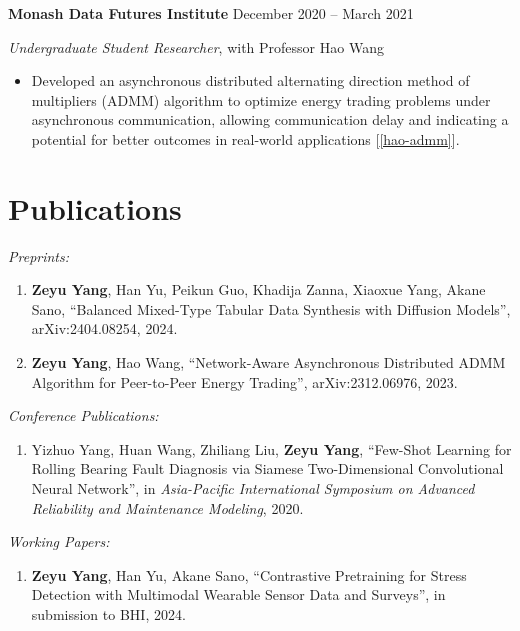 \documentclass[11pt]{article}
\begin{document}
\vspace{\lineskip}

\textbf{Monash Data Futures Institute} \hfill December 2020 -- March 2021

\textit{Undergraduate Student Researcher}, with Professor Hao Wang

\begin{itemize}
    \item Developed an asynchronous distributed alternating direction method of multipliers (ADMM) algorithm to optimize energy trading problems under asynchronous communication, allowing communication delay and indicating a potential for better outcomes in real-world applications [\ref{hao-admm}].
\end{itemize}

\section*{Publications}
    
\textit{Preprints:}

\begin{enumerate}	
    \item \label{akane-ddpm} \textbf{Zeyu Yang}, Han Yu, Peikun Guo, Khadija Zanna, Xiaoxue Yang, Akane Sano,
    ``Balanced Mixed-Type Tabular Data Synthesis with Diffusion Models'', arXiv:2404.08254, 2024.
    \item \label{hao-admm} \textbf{Zeyu Yang}, Hao Wang, 
    ``Network-Aware Asynchronous Distributed ADMM Algorithm for Peer-to-Peer Energy Trading'', arXiv:2312.06976, 2023.
\end{enumerate}

\vspace{\lineskip}

\textit{Conference Publications:}

\begin{enumerate}[resume]
    \item Yizhuo Yang, Huan Wang, Zhiliang Liu, \textbf{Zeyu Yang}, 
    ``Few-Shot Learning for Rolling Bearing Fault Diagnosis via Siamese Two-Dimensional Convolutional Neural Network'', 
    in \textit{Asia-Pacific International Symposium on Advanced Reliability and Maintenance Modeling}, 2020.
\end{enumerate}

\textit{Working Papers:}

\begin{enumerate}[resume]
    \item \label{akane-clsp} \textbf{Zeyu Yang}, Han Yu, Akane Sano, ``Contrastive Pretraining for Stress Detection with Multimodal Wearable Sensor Data and Surveys'', in submission to BHI, 2024.
\end{enumerate}
\end{document}
